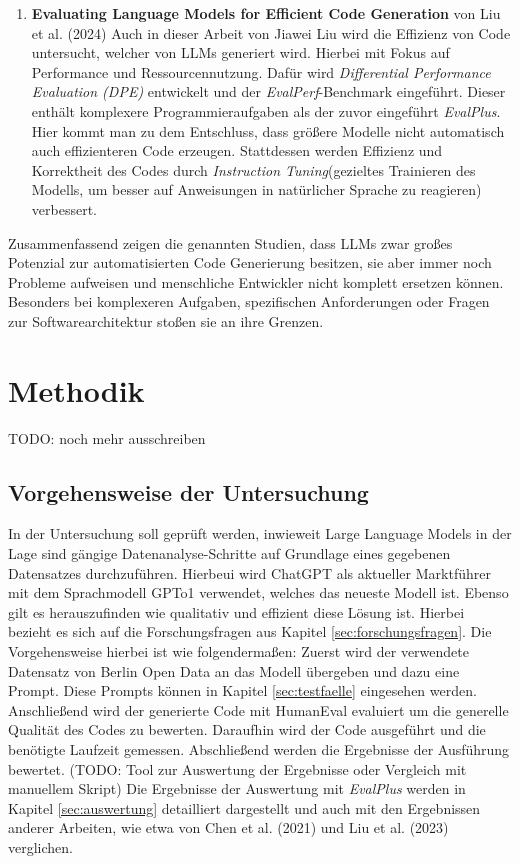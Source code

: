 \documentclass[11pt,a4paper]{article}
\begin{document}
\begin{enumerate}
    \item \textbf{Evaluating Language Models for Efficient Code Generation} von Liu et al. (2024) \cite{liu2024evaluating}
    Auch in dieser Arbeit von Jiawei Liu wird die Effizienz von Code untersucht, welcher von LLMs generiert wird. Hierbei mit Fokus auf Performance und Ressourcennutzung. Dafür wird \emph{Differential Performance Evaluation (DPE)} entwickelt und der \emph{EvalPerf}-Benchmark eingeführt. Dieser enthält komplexere Programmieraufgaben als der zuvor eingeführt \emph{EvalPlus}. Hier kommt man zu dem Entschluss, dass größere Modelle nicht automatisch auch effizienteren Code erzeugen. Stattdessen werden Effizienz und Korrektheit des Codes durch \emph{Instruction Tuning}(gezieltes Trainieren des Modells, um besser auf Anweisungen in natürlicher Sprache zu reagieren) verbessert.
\end{enumerate}
Zusammenfassend zeigen die genannten Studien, dass LLMs zwar großes Potenzial zur automatisierten Code Generierung besitzen, sie aber immer noch Probleme aufweisen und menschliche Entwickler nicht komplett ersetzen können. Besonders bei komplexeren Aufgaben, spezifischen Anforderungen oder Fragen zur Softwarearchitektur stoßen sie an ihre Grenzen.

\section{Methodik}
\label{sec:methodik}
TODO: noch mehr ausschreiben

\subsection{Vorgehensweise der Untersuchung}
    In der Untersuchung soll geprüft werden, inwieweit Large Language Models in der Lage sind gängige Datenanalyse-Schritte auf Grundlage eines gegebenen Datensatzes durchzuführen. Hierbeui wird ChatGPT als aktueller Marktführer mit dem Sprachmodell GPTo1 verwendet, welches das neueste Modell ist. Ebenso gilt es herauszufinden wie qualitativ und effizient diese Lösung ist. Hierbei bezieht es sich auf die Forschungsfragen aus Kapitel \ref{sec:forschungsfragen}.
    Die Vorgehensweise hierbei ist wie folgendermaßen: Zuerst wird der verwendete Datensatz von Berlin Open Data an das Modell übergeben und dazu eine Prompt. Diese Prompts können in Kapitel \ref{sec:testfaelle} eingesehen werden. Anschließend wird der generierte Code mit HumanEval evaluiert um die generelle Qualität des Codes zu bewerten. Daraufhin wird der Code ausgeführt und die benötigte Laufzeit gemessen. Abschließend werden die Ergebnisse der Ausführung bewertet. (TODO: Tool zur Auswertung der Ergebnisse oder Vergleich mit manuellem Skript)
    Die Ergebnisse der Auswertung mit \emph{EvalPlus}\cite{evalplus} werden in Kapitel \ref{sec:auswertung} detailliert dargestellt und auch mit den Ergebnissen anderer Arbeiten, wie etwa von Chen et al. (2021)\cite{chen2021evaluatinglargelanguagemodels} und Liu et al. (2023)\cite{NEURIPS2023_43e9d647} verglichen.
\end{document}
